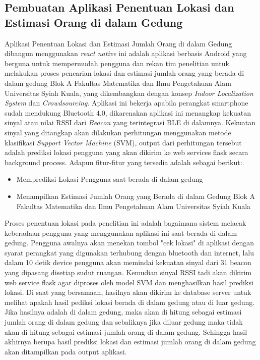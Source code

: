 \subsection{Pembuatan Aplikasi Penentuan Lokasi dan Estimasi Orang di dalam Gedung}
\par Aplikasi Penentuan Lokasi dan Estimasi Jumlah Orang di dalam Gedung dibangun menggunakan \textit{react native} ini adalah aplikasi berbasis Android yang berguna untuk mempermudah pengguna dan rekan tim penelitian untuk melakukan proses pencarian lokasi dan estimasi jumlah orang yang berada di dalam gedung Blok A Fakultas Matematika dan Ilmu Pengetahuan Alam Universitas Syiah Kuala, yang dikembangkan dengan konsep \textit{Indoor Localization System} dan \textit{Crowdsourcing}. Aplikasi ini bekerja apabila perangkat smartphone sudah mendukung Bluetooth 4.0, dikarenakan aplikasi ini menangkap kekuatan sinyal atau nilai RSSI dari \textit{Beacon} yang terintegrasi BLE di dalamnya. Kekuatan sinyal yang ditangkap akan dilakukan perhitungan menggunakan metode klasifikasi \textit{Support Vector Machine} (SVM), output dari perhitungan tersebut adalah prediksi lokasi pengguna yang akan dikirim ke web services flask secara background process. Adapun fitur-fitur yang tersedia adalah sebagai berikut:.

\begin {itemize}
\itemsep0em
\item Memprediksi Lokasi Pengguna saat berada di dalam gedung
\item Menampilkan Estimasi Jumlah Orang yang Berada di dalam Gedung Blok A Fakultas Matematika dan Ilmu Pengetahuan Alam Universitas Syiah Kuala
\end{itemize}

\par Proses penentuan lokasi pada penelitian ini adalah bagaimana sistem melacak keberadaan pengguna yang menggunakan aplikasi ini saat berada di dalam gedung.
Pengguna awalnya akan menekan tombol "cek lokasi" di aplikasi dengan syarat perangkat yang digunakan terhubung dengan bluetooth dan internet, lalu dalam 10 detik
device pengguna akan memindai kekuatan sinyal dari 31 beacon yang dipasang disetiap sudut ruangan. Kemudian sinyal RSSI tadi akan dikirim web service flask agar diproses
oleh model SVM dan menghasilkan hasil prediksi lokasi. Di saat yang bersamaan, hasilnya akan dikirim ke database server untuk melihat apakah hasil pediksi lokasi berada
di dalam gedung atau di luar gedung. Jika hasilnya adalah di dalam gedung, maka akan di hitung sebagai estimasi jumlah orang di dalam gedung dan sebaliknya jika diluar gedung maka tidak akan
di hitung sebagai estimasi jumlah orang di dalam gedung. Sehingga hasil akhirnya berupa hasil prediksi lokasi dan estimasi jumlah orang di dalam gedung akan ditampilkan pada output aplikasi.


